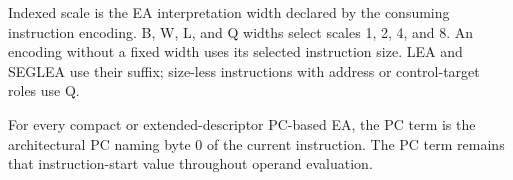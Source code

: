 Indexed scale is the EA interpretation width declared by the consuming instruction encoding. B, W, L, and Q widths select scales 1,
2, 4, and 8. An encoding without a fixed width uses its selected instruction size. LEA and SEGLEA use
their suffix; size-less instructions with address or control-target roles use Q.

For every compact or extended-descriptor PC-based EA, the PC term is the architectural PC naming byte 0 of the current instruction.
The PC term remains that instruction-start value throughout operand evaluation.

\clearpage
